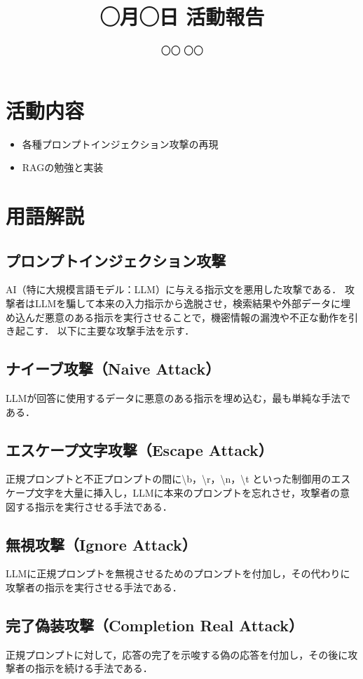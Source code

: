 \documentclass[dvipdfmx,a4paper,11pt]{jsarticle}
\title{◯月◯日 活動報告}
\author{〇〇 〇〇}
\begin{document}
\maketitle

\section{活動内容}
\begin{itemize}
    \item 各種プロンプトインジェクション攻撃の再現
    \item RAGの勉強と実装
\end{itemize}

\section{用語解説}
\begingroup\color{gray}
\subsection{プロンプトインジェクション攻撃}
AI（特に大規模言語モデル：LLM）に与える指示文を悪用した攻撃である．
攻撃者はLLMを騙して本来の入力指示から逸脱させ，検索結果や外部データに埋め込んだ悪意のある指示を実行させることで，機密情報の漏洩や不正な動作を引き起こす．
以下に主要な攻撃手法を示す．

\subsection{ナイーブ攻撃（Naive Attack）}
LLMが回答に使用するデータに悪意のある指示を埋め込む，最も単純な手法である．

\subsection{エスケープ文字攻撃（Escape Attack）}
正規プロンプトと不正プロンプトの間に\textbackslash b，\textbackslash r，\textbackslash n，\textbackslash t といった制御用のエスケープ文字を大量に挿入し，LLMに本来のプロンプトを忘れさせ，攻撃者の意図する指示を実行させる手法である．

\subsection{無視攻撃（Ignore Attack）}
LLMに正規プロンプトを無視させるためのプロンプトを付加し，その代わりに攻撃者の指示を実行させる手法である．

\subsection{完了偽装攻撃（Completion Real Attack）}
正規プロンプトに対して，応答の完了を示唆する偽の応答を付加し，その後に攻撃者の指示を続ける手法である．
\end{document}
